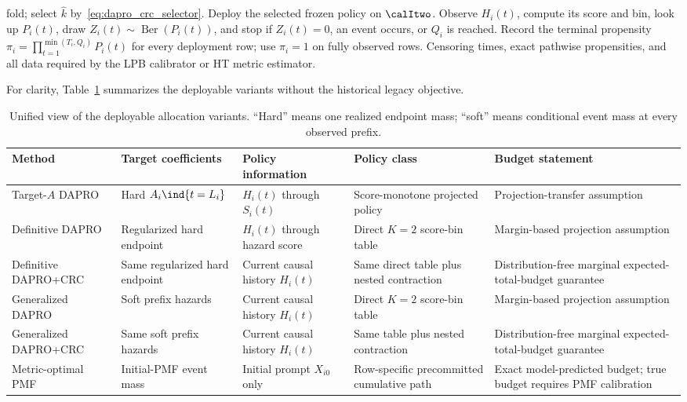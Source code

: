 \begin{algorithm}[htbp]
\begin{algorithmic}[1]
    fold; select $\widehat k$ by~\eqref{eq:dapro_crc_selector}.
    \STATE Deploy the selected frozen policy on $\calItwo$.
\ENDIF
{}
    \STATE Observe $H_i(t)$, compute its score and bin, look up $P_i(t)$, draw
    $Z_i(t)\sim\operatorname{Ber}(P_i(t))$, and stop if $Z_i(t)=0$, an event
    occurs, or $Q_i$ is reached.
\ENDFOR
\STATE Record the terminal propensity $\pi_i=\prod_{t=1}^{\min(T_i,Q_i)}P_i(t)$
for every deployment row; use $\pi_i=1$ on fully observed rows.
\RETURN Censoring times, exact pathwise propensities, and all data required by
the LPB calibrator or HT metric estimator.
\end{algorithmic}
\end{algorithm}

For clarity, Table~\ref{tab:dapro_variants} summarizes the deployable variants
without the historical legacy objective.

\begin{table}[htbp]
\centering
\caption{Unified view of the deployable allocation variants.  ``Hard'' means
one realized endpoint mass; ``soft'' means conditional event mass at every
observed prefix.}
\label{tab:dapro_variants}
\small
\begin{tabularx}{\linewidth}{lXXXX}
\toprule
Method & Target coefficients & Policy information & Policy class & Budget statement\\
\midrule
Target-$A$ DAPRO
& Hard $A_i\ind{t=L_i}$
& $H_i(t)$ through $S_i(t)$
& Score-monotone projected policy
& Projection-transfer assumption\\
Definitive DAPRO
& Regularized hard endpoint
& $H_i(t)$ through hazard score
& Direct $K=2$ score-bin table
& Margin-based projection assumption\\
Definitive DAPRO+CRC
& Same regularized hard endpoint
& Current causal history $H_i(t)$
& Same direct table plus nested contraction
& Distribution-free marginal expected-total-budget guarantee\\
Generalized DAPRO
& Soft prefix hazards
& Current causal history $H_i(t)$
& Direct $K=2$ score-bin table
& Margin-based projection assumption\\
Generalized DAPRO+CRC
& Same soft prefix hazards
& Current causal history $H_i(t)$
& Same table plus nested contraction
& Distribution-free marginal expected-total-budget guarantee\\
Metric-optimal PMF
& Initial-PMF event mass
& Initial prompt $X_{i0}$ only
& Row-specific precommitted cumulative path
& Exact model-predicted budget; true budget requires PMF calibration\\
\bottomrule
\end{tabularx}
\end{table}

